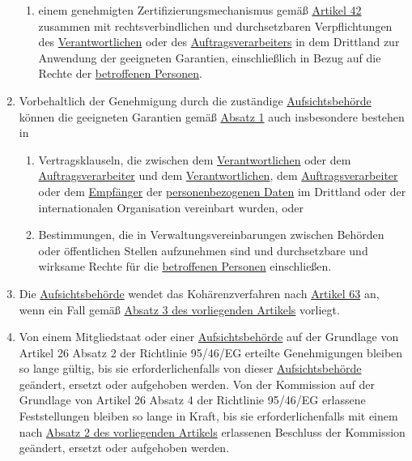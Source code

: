 \begin{enumerate}
\begin{enumerate}
    \item einem genehmigten Zertifizierungsmechanismus gemäß \hyperref[ch:42]{Artikel 42} zusammen mit
     rechtsverbindlichen und durchsetzbaren Verpflichtungen des \hyperref[itm:04-7]{Verantwortlichen} oder des \hyperref[itm:04-8]{Auftragsverarbeiters} in dem
     Drittland zur Anwendung der geeigneten Garantien, einschließlich in Bezug auf die Rechte der \hyperref[itm:04-1]{betroffenen
     Personen}.
    \label{itm:46-2f}

  \end{enumerate}

  \item Vorbehaltlich der Genehmigung durch die zuständige \hyperref[itm:04-21]{Aufsichtsbehörde} können die geeigneten Garantien gemäß
   \hyperref[itm:46-1]{Absatz 1} auch insbesondere bestehen in
  \label{itm:46-3}

  \begin{enumerate}
  
    \item Vertragsklauseln, die zwischen dem \hyperref[itm:04-7]{Verantwortlichen} oder dem \hyperref[itm:04-8]{Auftragsverarbeiter} und dem \hyperref[itm:04-7]{Verantwortlichen}, dem
     \hyperref[itm:04-8]{Auftragsverarbeiter} oder dem \hyperref[itm:04-9]{Empfänger} der \hyperref[itm:04-1]{personenbezogenen Daten} im Drittland oder der internationalen
     Organisation vereinbart wurden, oder
    \label{itm:46-3a}

    \item Bestimmungen, die in Verwaltungsvereinbarungen zwischen Behörden oder öffentlichen Stellen aufzunehmen sind
     und durchsetzbare und wirksame Rechte für die \hyperref[itm:04-1]{betroffenen Personen} einschließen.
    \label{itm:46-3b}

  \end{enumerate}

  \item Die \hyperref[itm:04-21]{Aufsichtsbehörde} wendet das Kohärenzverfahren nach \hyperref[ch:63]{Artikel 63} an, wenn ein Fall gemäß
   \hyperref[itm:46-3]{Absatz 3 des vorliegenden Artikels} vorliegt.
  \label{itm:46-4}

  \item Von einem Mitgliedstaat oder einer \hyperref[itm:04-21]{Aufsichtsbehörde} auf der Grundlage von Artikel 26 Absatz 2 der Richtlinie
   95/46/EG erteilte Genehmigungen bleiben so lange gültig, bis sie erforderlichenfalls von dieser
   \hyperref[itm:04-21]{Aufsichtsbehörde} geändert, ersetzt oder aufgehoben werden. Von der Kommission auf der Grundlage von Artikel 26
   Absatz 4 der Richtlinie 95/46/EG erlassene Feststellungen bleiben so lange in Kraft, bis sie erforderlichenfalls mit
   einem nach \hyperref[itm:46-2]{Absatz 2 des vorliegenden Artikels} erlassenen Beschluss der Kommission geändert,
   ersetzt oder aufgehoben werden.
  \label{itm:46-5}

\end{enumerate}


